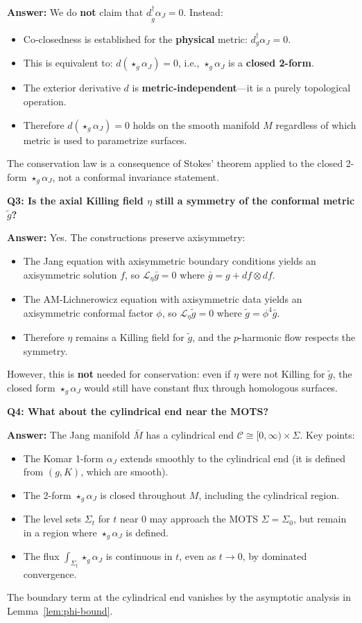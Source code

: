 \begin{remark}
\textbf{Answer:} We do \textbf{not} claim that $d^\dagger_{\tilde{g}} \alpha_J = 0$. Instead:
\begin{itemize}
    \item Co-closedness is established for the \textbf{physical} metric: $d^\dagger_g \alpha_J = 0$.
    \item This is equivalent to: $d(\star_g \alpha_J) = 0$, i.e., $\star_g \alpha_J$ is a \textbf{closed 2-form}.
    \item The exterior derivative $d$ is \textbf{metric-independent}---it is a purely topological operation.
    \item Therefore $d(\star_g \alpha_J) = 0$ holds on the smooth manifold $M$ regardless of which metric is used to parametrize surfaces.
\end{itemize}
The conservation law is a consequence of Stokes' theorem applied to the closed 2-form $\star_g \alpha_J$, not a conformal invariance statement.

\textbf{Q3: Is the axial Killing field $\eta$ still a symmetry of the conformal metric $\tilde{g}$?}

\textbf{Answer:} Yes. The constructions preserve axisymmetry:
\begin{itemize}
    \item The Jang equation with axisymmetric boundary conditions yields an axisymmetric solution $f$, so $\mathcal{L}_\eta \bar{g} = 0$ where $\bar{g} = g + df \otimes df$.
    \item The AM-Lichnerowicz equation with axisymmetric data yields an axisymmetric conformal factor $\phi$, so $\mathcal{L}_\eta \tilde{g} = 0$ where $\tilde{g} = \phi^4 \bar{g}$.
    \item Therefore $\eta$ remains a Killing field for $\tilde{g}$, and the $p$-harmonic flow respects the symmetry.
\end{itemize}
However, this is \textbf{not} needed for conservation: even if $\eta$ were not Killing for $\tilde{g}$, the closed form $\star_g \alpha_J$ would still have constant flux through homologous surfaces.

\textbf{Q4: What about the cylindrical end near the MOTS?}

\textbf{Answer:} The Jang manifold $\bar{M}$ has a cylindrical end $\mathcal{C} \cong [0, \infty) \times \Sigma$. Key points:
\begin{itemize}
    \item The Komar 1-form $\alpha_J$ extends smoothly to the cylindrical end (it is defined from $(g, K)$, which are smooth).
    \item The 2-form $\star_g \alpha_J$ is closed throughout $M$, including the cylindrical region.
    \item The level sets $\Sigma_t$ for $t$ near 0 may approach the MOTS $\Sigma = \Sigma_0$, but remain in a region where $\star_g \alpha_J$ is defined.
    \item The flux $\int_{\Sigma_t} \star_g \alpha_J$ is continuous in $t$, even as $t \to 0$, by dominated convergence.
\end{itemize}
The boundary term at the cylindrical end vanishes by the asymptotic analysis in Lemma~\ref{lem:phi-bound}.


\end{remark}
